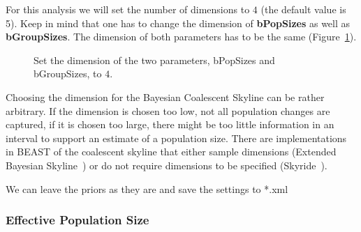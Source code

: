 \documentclass[11pt]{article}
\begin{document}
For this analysis we will set the number of dimensions to $4$ (the default value is 5). Keep in mind that one has to change the dimension of \textbf{bPopSizes} as well as \textbf{bGroupSizes}. The dimension of both parameters has to be the same (Figure~\ref{fig:dimensions}).

\begin{figure}[h!]
\centering
{}
\caption{\small Set the dimension of the two parameters, bPopSizes and bGroupSizes, to $4$.}
\label{fig:dimensions}
\end{figure}


Choosing the dimension for the Bayesian Coalescent Skyline can be rather arbitrary. If the dimension is chosen too low, not all population changes are captured, if it is chosen too large, there might be too little information in an interval to support an estimate of a population size. There are implementations in BEAST of the coalescent skyline that either sample dimensions (Extended Bayesian Skyline~\citep{Heled2008}) or do not require dimensions to be specified (Skyride~\citep{Minin2008}).

We can leave the priors as they are and save the settings to *.xml


\clearpage

\subsubsection{Effective Population Size}
\end{document}
